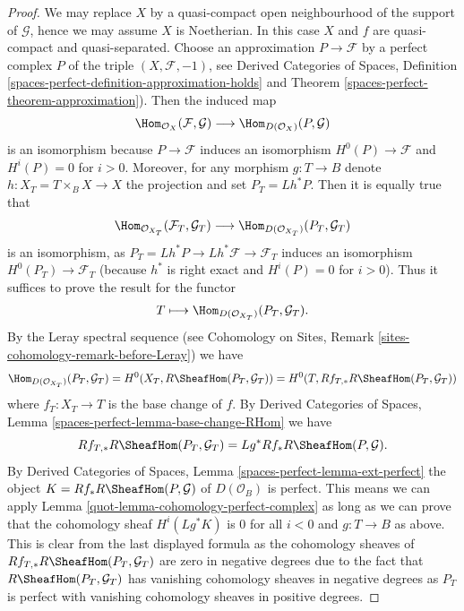 \begin{proof}

We may replace $X$ by a quasi-compact open neighbourhood of
the support of $\mathcal{G}$, hence we may assume $X$ is Noetherian.
In this case $X$ and $f$ are quasi-compact and quasi-separated.
Choose an approximation $P \to \mathcal{F}$ by a perfect complex $P$ of
the triple $(X, \mathcal{F}, -1)$, see
Derived Categories of Spaces, Definition
\ref{spaces-perfect-definition-approximation-holds} and
Theorem \ref{spaces-perfect-theorem-approximation}).
Then the induced map
$$
\Hom_{\mathcal{O}_X}(\mathcal{F}, \mathcal{G})
\longrightarrow
\Hom_{D(\mathcal{O}_X)}(P, \mathcal{G})
$$
is an isomorphism because $P \to \mathcal{F}$ induces an isomorphism
$H^0(P) \to \mathcal{F}$ and $H^i(P) = 0$ for $i > 0$.
Moreover, for any morphism $g : T \to B$
denote $h : X_T = T \times_B X \to X$ the projection and set
$P_T = Lh^*P$. Then it is equally true that
$$
\Hom_{\mathcal{O}_{X_T}}(\mathcal{F}_T, \mathcal{G}_T)
\longrightarrow
\Hom_{D(\mathcal{O}_{X_T})}(P_T, \mathcal{G}_T)
$$
is an isomorphism, as $P_T = Lh^*P \to Lh^*\mathcal{F} \to \mathcal{F}_T$
induces an isomorphism $H^0(P_T) \to \mathcal{F}_T$ (because $h^*$ is
right exact and $H^i(P) = 0$ for $i > 0$). Thus it suffices to prove the
result for the functor
$$
T \longmapsto \Hom_{D(\mathcal{O}_{X_T})}(P_T, \mathcal{G}_T).
$$
By the Leray spectral sequence (see Cohomology on Sites, Remark
\ref{sites-cohomology-remark-before-Leray}) we have
$$
\Hom_{D(\mathcal{O}_{X_T})}(P_T, \mathcal{G}_T) =
H^0(X_T, R\SheafHom(P_T, \mathcal{G}_T)) =
H^0(T, Rf_{T, *}R\SheafHom(P_T, \mathcal{G}_T))
$$
where $f_T : X_T \to T$ is the base change of $f$. By
Derived Categories of Spaces, Lemma
\ref{spaces-perfect-lemma-base-change-RHom}
we have
$$
Rf_{T, *}R\SheafHom(P_T, \mathcal{G}_T) = Lg^*Rf_*R\SheafHom(P, \mathcal{G}).
$$
By
Derived Categories of Spaces, Lemma
\ref{spaces-perfect-lemma-ext-perfect}
the object $K = Rf_*R\SheafHom(P, \mathcal{G})$ of $D(\mathcal{O}_B)$
is perfect. This means we can apply
Lemma \ref{quot-lemma-cohomology-perfect-complex}
as long as we can prove that the cohomology sheaf
$H^i(Lg^*K)$ is $0$ for all $i < 0$ and $g : T \to B$ as above.
This is clear from the last displayed formula as
the cohomology sheaves of
$Rf_{T, *}R\SheafHom(P_T, \mathcal{G}_T)$
are zero in negative degrees
due to the fact that $R\SheafHom(P_T, \mathcal{G}_T)$ has vanishing
cohomology sheaves in negative degrees as $P_T$ is perfect with
vanishing cohomology sheaves in positive degrees.
\end{proof}

